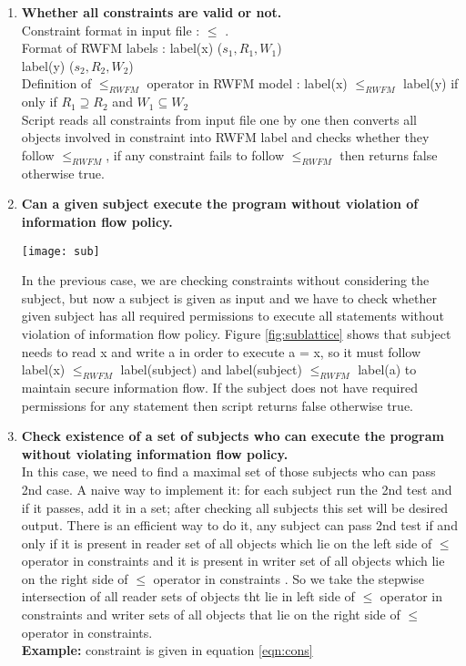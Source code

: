 \begin{enumerate}
	\item{\textbf{Whether all constraints are valid or not.}\\
		Constraint format in input file :  $\le$ .\\
		Format of RWFM labels : label(x) ($s_1,R_1,W_1$)\\
		\hspace*{4.5cm}label(y) ($s_2,R_2,W_2$)\\
		Definition of $\leqslant_{RWFM}$ operator in RWFM model  : label(x) $\leqslant_{RWFM}$ label(y) if only if $R_1 \supseteq R_2$ and $ W_1 \subseteq W_2 $ \hspace*{1cm}\cite{rwfm}\\
		Script reads all constraints from input file one by one then converts all objects involved in constraint into RWFM label and  checks whether they follow $\leqslant_{RWFM}$, if any constraint fails to follow $\leqslant_{RWFM}$ then returns false otherwise true.
		} 
	\item{\textbf{Can a given subject execute the program without violation of information flow policy.}\\
		\begin{figure*}
			\centering
			\texttt{[image: sub]}
			\caption{Lattice for information flow in a =x and y =b,(a)without subject (b) with subject.}
			\label{fig:sublattice}
		\end{figure*}
		In the previous case, we are checking constraints without considering the subject, but now a subject is given as input and we have to check whether given subject has all required permissions to execute all statements without violation of information flow policy. Figure \ref{fig:sublattice} shows that subject needs to read x and write a in order to execute a = x, so it must follow label(x)  $\leqslant_{RWFM}$ label(subject) and label(subject) $\leqslant_{RWFM}$ label(a) to maintain secure information flow. If the subject does not have required permissions for any statement then script returns false otherwise true.     
		}
    \item{\textbf{Check existence of a set of subjects who can execute the program without violating information flow policy. }\\
    	In this case, we need to find a maximal set of those subjects who can pass 2nd case. A naive way to implement it: for each subject run the 2nd test and if it passes, add it in a set; after checking all subjects this set will be desired output. There is an efficient way to do it, any subject can pass 2nd test if and only if it is present in reader set of all objects which lie on the left side of $\leqslant$ operator in constraints and it is  present in writer set of all objects which lie on the right side of $\leqslant$ operator in constraints . So we take the stepwise intersection of all reader sets of objects tht lie in left side of $\leqslant$ operator in constraints and writer sets of all objects that lie on the right side of $\leqslant$ operator in constraints.\\ \textbf{Example:} constraint is given in equation \ref{eqn:cons}\\
}
\end{enumerate}
